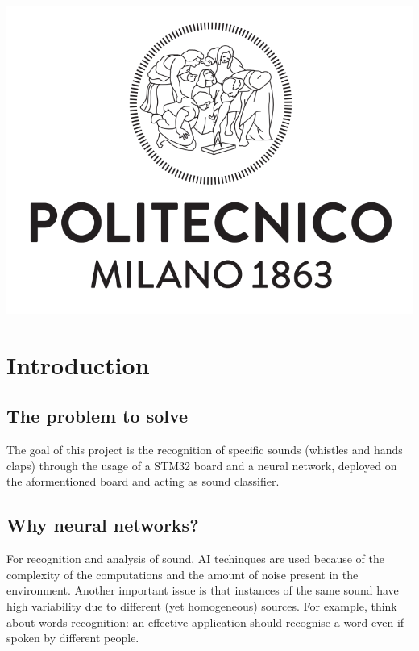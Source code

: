 \documentclass[12pt]{article}
\begin{document}
\begin{titlepage}
\begin{center}
	\includegraphics[scale=0.23]{img/Logo_Politecnico_Milano.png}                                               
\end{center}

\vfill

\end{titlepage}


\section{Introduction}

\subsection{The problem to solve}
The goal of this project is the recognition of specific sounds (whistles and hands claps) through the usage of a STM32 board and a neural network, deployed on the aformentioned board and acting as sound classifier.

\subsection{Why neural networks?}
For recognition and analysis of sound, AI techinques are used because of the complexity of the computations and the amount of noise present in the environment. Another important issue is that instances of the same sound have high variability due to different (yet homogeneous) sources. For example, think about words recognition: an effective application should recognise a word even if spoken by different people.
\end{document}
